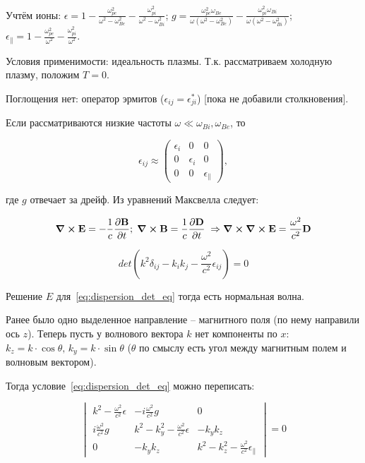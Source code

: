 \documentclass[10pt, a4paper]{article}
\begin{document}
Учтём ионы: $\epsilon = 1-\frac{\omega_{pe}^2}{\omega^2-\omega_{Be}^2}-\frac{\omega_{pi}^2}{\omega^2-\omega_{Bi}^2}$; $g = \frac{\omega_{pe}^2\omega_{Be}} {\omega\left(\omega^2-\omega_{Be}^2\right)}-\frac{\omega_{pi}^2\omega_{Bi}} {\omega\left(\omega^2-\omega_{Bi}^2\right)}$; $\epsilon_\parallel = 1-\frac{\omega_{pe}^2}{\omega^2}-\frac{\omega_{pi}^2}{\omega^2}$.

Условия применимости: идеальность плазмы. Т.к. рассматриваем холодную плазму, положим $T = 0$. 

Поглощения нет: оператор эрмитов ($\epsilon_{ij} = \epsilon_{ji}^{*}$) [пока не добавили столкновения].

Если рассматриваются низкие частоты $\omega\ll\omega_{Bi}, \omega_{Be}$, то 

\begin{equation*}
	\epsilon_{ij} \approx
	\begin{pmatrix}
		\epsilon_i & 0 & 0 \\
		0 & \epsilon_i & 0 \\
		0 & 0 & \epsilon_\parallel
	\end{pmatrix},
\end{equation*}

где $g$ отвечает за дрейф. Из уравнений Максвелла следует:

\begin{equation*}
	\curl\vb{E} = -\frac{1}{c}\pdv{\vb{B}}{t};\; \curl\vb{B}=\frac{1}{c}\pdv{\vb{D}}{t}\;\Rightarrow\curl\curl\vb{E} = \frac{\omega^2}{c^2}\vb{D}
\end{equation*}

\begin{equation} \label{eq:dispersion_det_eq}
	det(k^2\delta_{ij}-k_ik_j-\frac{\omega^2}{c^2}\epsilon_{ij})=0
\end{equation}

Решение $E$ для~\eqref{eq:dispersion_det_eq} тогда есть нормальная волна.

Ранее было одно выделенное направление -- магнитного поля (по нему направили ось $z$). Теперь пусть у волнового вектора $k$ нет компоненты по $x$: $k_z = k\cdot\cos\theta,\,k_y = k\cdot\sin\theta$ ($\theta$ по смыслу есть угол между магнитным полем и волновым вектором). 

Тогда условие~\eqref{eq:dispersion_det_eq} можно переписать:

\begin{equation*}
	\begin{vmatrix}
		k^2-\frac{\omega^2}{c^2}\epsilon & -i\frac{\omega^2}{c^2}g & 0 \\
		i\frac{\omega^2}{c^2}g & k^2-k_y^2- \frac{\omega^2}{c^2}\epsilon & -k_yk_z \\
		0 & -k_yk_z & k^2-k_z^2- \frac{\omega^2}{c^2}\epsilon_\parallel
	\end{vmatrix}=0
\end{equation*}
\end{document}
